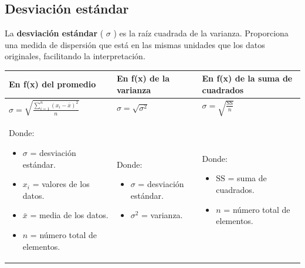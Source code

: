 \documentclass[
  letterpaper,
  DIV=11,
  numbers=noendperiod]{scrreprt}
\providecommand{\tightlist}{%
  \setlength{\itemsep}{0pt}\setlength{\parskip}{0pt}}
\begin{document}
\subsection{Desviación estándar}\label{desviaciuxf3n-estuxe1ndar}

La \textbf{desviación estándar} ( \(\sigma\) ) es la raíz cuadrada de la
varianza. Proporciona una medida de dispersión que está en las mismas
unidades que los datos originales, facilitando la interpretación.

\begin{longtable}[]{@{}
  >{\raggedright\arraybackslash}p{}
  >{\raggedright\arraybackslash}p{}
  >{\raggedright\arraybackslash}p{}@{}}
\toprule\noalign{}
\begin{minipage}[b]{\linewidth}\raggedright
En f(x) del promedio
\end{minipage} & \begin{minipage}[b]{\linewidth}\raggedright
En f(x) de la varianza
\end{minipage} & \begin{minipage}[b]{\linewidth}\raggedright
En f(x) de la suma de cuadrados
\end{minipage} \\
\midrule\noalign{}
\endhead
\bottomrule\noalign{}
\endlastfoot
\(
\sigma = \sqrt{\frac{\sum_{i=1}^{n} (x_i - \bar{x})^2}{n}}
\) & \(
\sigma = \sqrt{\sigma^2}
\) & \(
\sigma = \sqrt{\frac{\text{SS}}{n}}
\) \\
\begin{minipage}[t]{\linewidth}\raggedright
Donde:

\begin{itemize}
\tightlist
\item
  \(\sigma\) = desviación estándar.
\item
  \(x_i\) = valores de los datos.
\item
  \(\bar{x}\) = media de los datos.
\item
  \(n\) = número total de elementos.
\end{itemize}
\end{minipage} & \begin{minipage}[t]{\linewidth}\raggedright
Donde:

\begin{itemize}
\tightlist
\item
  \(\sigma\) = desviación estándar.
\item
  \(\sigma^2\) = varianza.
\end{itemize}
\end{minipage} & \begin{minipage}[t]{\linewidth}\raggedright
Donde:

\begin{itemize}
\tightlist
\item
  \(\text{SS}\) = suma de cuadrados.
\item
  \(n\) = número total de elementos.
\end{itemize}
\end{minipage} \\
\end{longtable}
\end{document}
